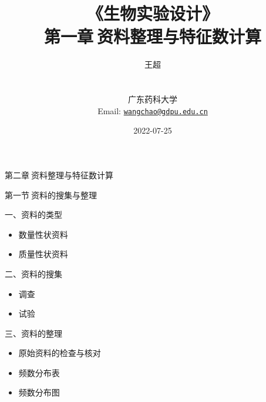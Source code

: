 \documentclass[
  10pt,
  ignorenonframetext,
]{beamer}
\title{《生物实验设计》\\
第一章\(~\)资料整理与特征数计算}
\author{王超\\
\strut \\
广东药科大学\\
Email:
\href{mailto:wangchao@gdpu.edu.cn}{\nolinkurl{wangchao@gdpu.edu.cn}}}
\date{2022-07-25}
\begin{document}
\frame{\titlepage}

\begin{frame}{}
\protect\hypertarget{section}{}
\LARGE 第二章\(~\)资料整理与特征数计算
\end{frame}

\begin{frame}{第一节\(~\)资料的搜集与整理}
\protect\hypertarget{ux7b2cux4e00ux8282ux8d44ux6599ux7684ux641cux96c6ux4e0eux6574ux7406}{}
\end{frame}

\begin{frame}{一、资料的类型}
\protect\hypertarget{ux4e00ux8d44ux6599ux7684ux7c7bux578b}{}
\begin{itemize}
\item
  数量性状资料
\item
  质量性状资料
\end{itemize}
\end{frame}

\begin{frame}{二、资料的搜集}
\protect\hypertarget{ux4e8cux8d44ux6599ux7684ux641cux96c6}{}
\begin{itemize}
\item
  调查
\item
  试验
\end{itemize}
\end{frame}

\begin{frame}{三、资料的整理}
\protect\hypertarget{ux4e09ux8d44ux6599ux7684ux6574ux7406}{}
\begin{itemize}
\item
  原始资料的检查与核对
\item
  频数分布表
\item
  频数分布图
\end{itemize}
\end{frame}
\end{document}
